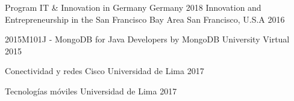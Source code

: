 



\begin{cvhonors}

  \cvhonor
    {Program IT \& Innovation in Germany} %
    {Germany} %
    {2018} %
  \cvhonor
    {Innovation and Entrepreneurship in the San Francisco Bay Area} %
    {San Francisco, U.S.A} %
    {2016} %

  \cvhonor
    {2015M101J - MongoDB for Java Developers by MongoDB University}
    {Virtual}
    {2015}

\end{cvhonors}




\begin{cvhonors}

  \cvhonor
    {Conectividad y redes Cisco} %
    {Universidad de Lima} %
    {2017} %

  \cvhonor
    {Tecnologías móviles} %
    {Universidad de Lima} %
    {2017} %

\end{cvhonors}
